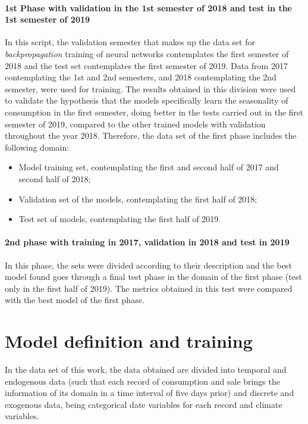             \paragraph{1st Phase with validation in the 1st semester of 2018 and test in the 1st semester of 2019}
                 In this script, the validation semester that makes up the data set for  \textit{backpropagation} training of neural networks contemplates the first semester of 2018 and the test set contemplates the first semester of 2019.
                Data from 2017 contemplating the 1st and 2nd semesters, and 2018 contemplating the 2nd semester, were used for training. The results obtained in this division were used to validate the hypothesis that the models specifically learn the seasonality of consumption in the first semester, doing better in the tests carried out in the first semester of 2019, compared to the other trained models with validation throughout the year 2018.
                Therefore, the data set of the first phase includes the following domain:
            \begin{itemize}
                    \item Model training set, contemplating the first and second half of 2017 and second half of 2018;
                    \item Validation set of the models, contemplating the first half of 2018;
                    \item Test set of models, contemplating the first half of 2019.             
            \end{itemize}
            
            \paragraph{2nd phase with training in 2017, validation in 2018 and test in 2019}
                In this phase, the sets were divided according to their description and the best model found goes through a final test phase in the domain of the first phase (test only in the first half of 2019).
                The metrics obtained in this test were compared with the best model of the first phase.
    
    \section{Model definition and training}
                In the data set of this work, the data obtained are divided into temporal and endogenous data (such that each record of consumption and sale brings the information of its domain in a time interval of five days prior) and discrete and exogenous data, being categorical date variables for each record and climate variables.
                
